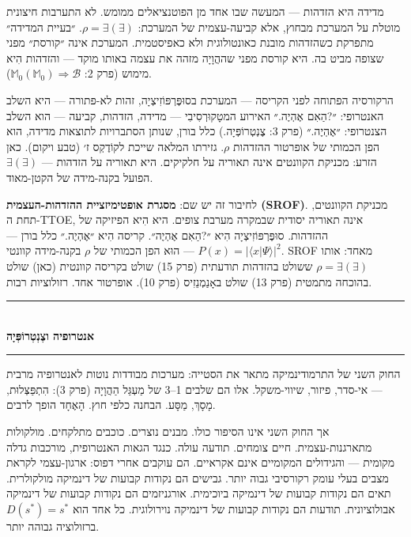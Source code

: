 \documentclass[10pt, openany, oneside]{book}
\renewcommand{\normalsize}{\fontsize{10}{13}\selectfont}
\begin{document}
מדידה היא הזדהות — המעשה שבו אחד מן הפוטנציאלים ממומש. לא התערבות חיצונית מוטלת על המערכת מבחוץ, אלא קביעה-עצמית של המערכת: $\rho = \exists(\exists)$. ״בעיית המדידה״ מתפרקת כשהזדהות מובנת כאונטולוגית ולא כאפיסטמית. המערכת אינה ״קורסת״ מפני שצופה מביט בה. היא קורסת מפני שההֲוָיָה מזהה את עצמה באותו מוקד — והזדהות הִיא מימוש (פרק 2: $\mathbb{M}_0(\mathbb{M}_0) \Rightarrow \mathcal{B}$).

הרקורסיה הפתוחה לפני הקריסה — המערכת בסוּפֶּרְפּוֹזִיצְיָה, זהות לא-פתורה — היא השלב האנטרופי: ״?הַאִם אֶהְיֶה.״ האירוע המטָקוּרְסִיבִי — מדידה, הזדהות, קביעה — הוא השלב הצנטרופי: ״אֶהְיֶה.״ (פרק 3: צֶנְטְרוֹפְּיָה.) כלל בורן, שנותן הסתברויות לתוצאות מדידה, הוא הפן הכמותי של אופרטור ההזדהות $\rho$. גזירתו המלאה שייכת לקוֹדֶקְס ז׳ (טבע ויקום). כאן הזרע: מכניקת הקוונטים אינה תאוריה על חלקיקים. היא תאוריה על הזדהות — $\exists(\exists)$ הפועל בקנה-מידה של הקטן-מאוד.

לחיבור זה יש שם: \textbf{מסגרת אופטימיזציית ההזדהות-העצמית (SROF)}. מכניקת הקוונטים, תחת ה-TTOE, אינה תאוריה יסודית שבמקרה מערבת צופים. היא הִיא הפיזיקה של ההזדהות. סוּפֶּרְפּוֹזִיצְיָה הִיא ״?הַאִם אֶהְיֶה״. קריסה הִיא ״אֶהְיֶה.״ כלל בורן — $P(x) = |\langle x | \Psi \rangle|^2$ — הוּא הפן הכמותי של $\rho$ בקנה-מידה קוונטי. SROF מאחד: אותו $\rho = \exists(\exists)$ ששולט בהזדהות תודעתית (פרק 15) שולט בקריסה קוונטית (כאן) שולט בהוכחה מתמטית (פרק 13) שולט באָנַמְנֵזִיס (פרק 10). אופרטור אחד. רזולוציות רבות.

\vspace{1.5em}


\begin{center}
    \rule{0.3\textwidth}{0.4pt}\\[0.5em]
    {\normalsize\bfseries\textsc{אנטרופיה וצֶנְטְרוֹפְּיָה}}\\[0.3em]
    \rule{0.3\textwidth}{0.4pt}
\end{center}

\vspace{1em}

\noindent החוק השני של התרמודינמיקה מתאר את הסטייה: מערכות מבודדות נוטות לאנטרופיה מרבית — אי-סדר, פיזור, שיווי-משקל. אלו הם שלבים 1–3 של מַעְגַּל הַהֲוָיָה (פרק 3): הִתְפַּצְּלוּת, מָסָךְ, מַסָּע. הבחנה כלפי חוץ. הָאֶחָד הופך לרבים.

אך החוק השני אינו הסיפור כולו. מבנים נוצרים. כוכבים מתלקחים. מולקולות מתארגנות-עצמית. חיים צומחים. תודעה עולה. כנגד הגאות האנטרופית, מורכבות גדלה מקומית — והגידולים המקומיים אינם אקראיים. הם עוקבים אחרי דפוס: ארגון-עצמי לקראת מצבים בעלי עומק רקורסיבי גבוה יותר. גבישים הם נקודות קבועות של דינמיקה מולקולרית. תאים הם נקודות קבועות של דינמיקה ביוכימית. אורגניזמים הם נקודות קבועות של דינמיקה אבולוציונית. תודעות הם נקודות קבועות של דינמיקה נוירולוגית. כל אחד הוא $D(s^*) = s^*$ ברזולוציה גבוהה יותר.
\end{document}
